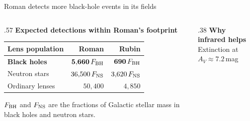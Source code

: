 \begin{frame}{Roman detects more black-hole events in its fields}
\begin{columns}[T,onlytextwidth]
\begin{column}{.57\linewidth}
\centering
\textbf{Expected detections within Roman's footprint}\\[4pt]
{\small
\setlength{\tabcolsep}{5pt}
\renewcommand{\arraystretch}{1.22}
\begin{tabular}{@{}lrr@{}}
\toprule
Lens population & Roman & Rubin \\
\midrule
\rowcolor{jdlightestblue}
\textbf{Black holes} & $\mathbf{5{,}660}\,F_{\rm BH}$ & $\mathbf{690}\,F_{\rm BH}$ \\
Neutron stars & $36{,}500\,F_{\rm NS}$ & $3{,}620\,F_{\rm NS}$ \\
Ordinary lenses & $50{,}400$ & $4{,}850$ \\
\bottomrule
\end{tabular}\par}
\vspace{2mm}
\footnotesize $F_{\rm BH}$ and $F_{\rm NS}$ are the fractions of Galactic stellar mass in black holes and neutron stars.
\end{column}
\begin{column}{.38\linewidth}
\centering
\textbf{Why infrared helps}\\
{\small Extinction at $A_V\approx7.2$\,mag}
\end{column}
\end{columns}


\end{frame}

